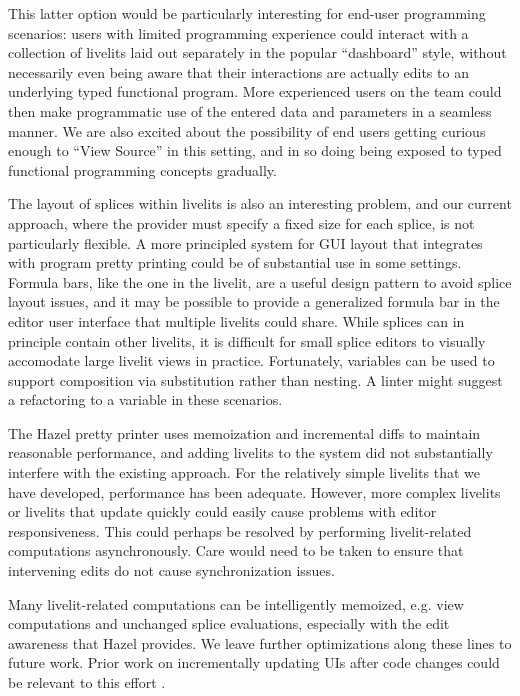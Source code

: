 This latter option 
would be particularly interesting for end-user programming scenarios: users with limited
programming experience 
could interact with a collection of livelits laid out separately in the popular ``dashboard'' style, 
without necessarily
even being aware that their interactions are actually edits to an underlying typed
functional program. More experienced users on the team could then make programmatic use of the entered
data and parameters in a seamless manner. We are also excited about the possibility of end users
getting curious enough to ``View Source'' in this setting, and in so doing 
being exposed to typed functional programming concepts gradually.

The layout of splices within livelits is also an interesting problem, and our current approach, where 
the provider must specify a fixed size for each splice, is not particularly flexible. 
A more principled system for GUI layout that integrates with program pretty 
printing could be of substantial use in some settings. Formula bars, like the one in the 
livelit, are a useful design pattern to avoid splice layout issues, and it may be possible to provide 
a generalized formula bar in the editor user interface that multiple livelits could share.
While splices can in principle contain other livelits, it is difficult for small splice editors to 
visually accomodate large livelit views in practice. 
Fortunately, variables can be used to support composition via substitution 
rather than nesting. A linter might suggest a refactoring to a variable in these scenarios.

The Hazel pretty printer uses memoization and incremental diffs to maintain reasonable performance,
and adding livelits to the system did not substantially interfere with the existing approach.
For the relatively simple livelits that we have developed, performance has been adequate.
However, more complex  livelits or livelits that update quickly 
could easily cause problems with editor responsiveness.
This could perhaps be resolved by performing livelit-related computations asynchronously. Care 
would need to be taken to ensure that intervening edits do not cause synchronization issues.

Many livelit-related computations can be intelligently memoized, e.g. view computations and unchanged splice evaluations,
especially with the edit awareness that Hazel provides. 
We leave further optimizations along these lines to future work.
Prior work on incrementally updating UIs after code changes could be relevant to this effort \cite{burckhardt2013s}.